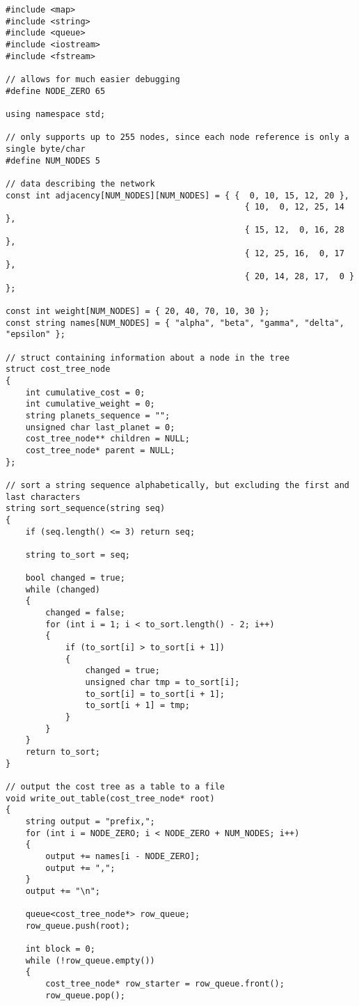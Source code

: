 \documentclass[
]{article}
\begin{document}
\begin{verbatim}
#include <map>
#include <string>
#include <queue>
#include <iostream>
#include <fstream>

// allows for much easier debugging
#define NODE_ZERO 65

using namespace std;

// only supports up to 255 nodes, since each node reference is only a single byte/char
#define NUM_NODES 5

// data describing the network
const int adjacency[NUM_NODES][NUM_NODES] = { {  0, 10, 15, 12, 20 },
                                                { 10,  0, 12, 25, 14 },
                                                { 15, 12,  0, 16, 28 },
                                                { 12, 25, 16,  0, 17 },
                                                { 20, 14, 28, 17,  0 }
};

const int weight[NUM_NODES] = { 20, 40, 70, 10, 30 };
const string names[NUM_NODES] = { "alpha", "beta", "gamma", "delta", "epsilon" };

// struct containing information about a node in the tree
struct cost_tree_node
{
    int cumulative_cost = 0;
    int cumulative_weight = 0;
    string planets_sequence = "";
    unsigned char last_planet = 0;
    cost_tree_node** children = NULL;
    cost_tree_node* parent = NULL;
};

// sort a string sequence alphabetically, but excluding the first and last characters
string sort_sequence(string seq)
{
    if (seq.length() <= 3) return seq;

    string to_sort = seq;

    bool changed = true;
    while (changed)
    {
        changed = false;
        for (int i = 1; i < to_sort.length() - 2; i++)
        {
            if (to_sort[i] > to_sort[i + 1])
            {
                changed = true;
                unsigned char tmp = to_sort[i];
                to_sort[i] = to_sort[i + 1];
                to_sort[i + 1] = tmp;
            }
        }
    }
    return to_sort;
}

// output the cost tree as a table to a file
void write_out_table(cost_tree_node* root)
{
    string output = "prefix,";
    for (int i = NODE_ZERO; i < NODE_ZERO + NUM_NODES; i++)
    {
        output += names[i - NODE_ZERO];
        output += ",";
    }
    output += "\n";

    queue<cost_tree_node*> row_queue;
    row_queue.push(root);

    int block = 0;
    while (!row_queue.empty())
    {
        cost_tree_node* row_starter = row_queue.front();
        row_queue.pop();


\end{verbatim}
\end{document}
